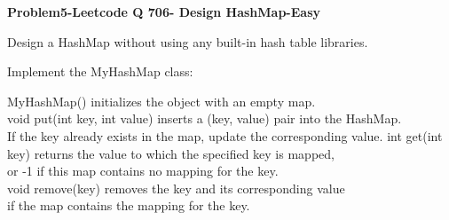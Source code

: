 \documentclass[11pt]{article}
\makeatletter
\newcommand{\boxspacing}{\kern\kvtcb@left@rule\kern\kvtcb@boxsep}
\newcommand{\prompt}[4]{
        {\ttfamily\llap{{\color{#2}[#3]:\hspace{3pt}#4}}\vspace{-\baselineskip}}
    }
\makeatother
\begin{document}
    \begin{tcolorbox}[breakable, size=fbox, boxrule=1pt, pad at break*=1mm,colback=cellbackground, colframe=cellborder]
\prompt{In}{incolor}{ }{\boxspacing}
\begin{Verbatim}[commandchars=\\\{\}]

\end{Verbatim}
\end{tcolorbox}

    \textbf{Problem5-Leetcode Q 706- Design HashMap-Easy}

Design a HashMap without using any built-in hash table libraries.

Implement the MyHashMap class:

MyHashMap() initializes the object with an empty map.\\
void put(int key, int value) inserts a (key, value) pair into the
HashMap.\\
If the key already exists in the map, update the corresponding value.
int get(int key) returns the value to which the specified key is
mapped,\\
or -1 if this map contains no mapping for the key.\\
void remove(key) removes the key and its corresponding value\\
if the map contains the mapping for the key.
\end{document}
